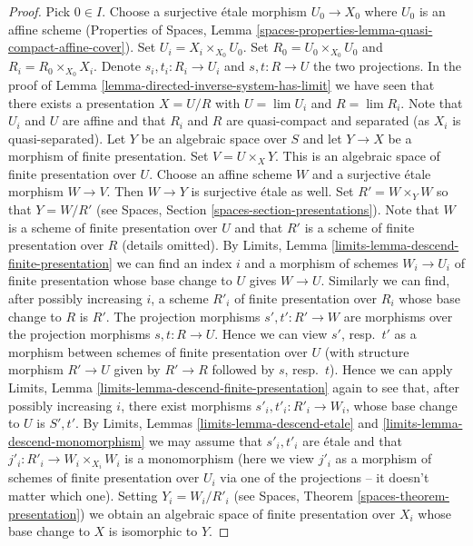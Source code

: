 \begin{proof}
Pick $0 \in I$. Choose a surjective \'etale morphism $U_0 \to X_0$ where
$U_0$ is an affine scheme (Properties of Spaces, Lemma
\ref{spaces-properties-lemma-quasi-compact-affine-cover}).
Set $U_i = X_i \times_{X_0} U_0$. Set $R_0 = U_0 \times_{X_0} U_0$ and
$R_i = R_0 \times_{X_0} X_i$. Denote $s_i, t_i : R_i \to U_i$ and
$s, t : R \to U$ the two projections. In the proof of
Lemma \ref{lemma-directed-inverse-system-has-limit} we have
seen that there exists a presentation $X = U/R$ with
$U = \lim U_i$ and $R = \lim R_i$. Note that $U_i$ and $U$ are affine and
that $R_i$ and $R$ are quasi-compact and separated (as $X_i$ is
quasi-separated). Let $Y$ be an algebraic space over $S$ and let
$Y \to X$ be a morphism of finite presentation. Set $V = U \times_X Y$.
This is an algebraic space of finite presentation over $U$.
Choose an affine scheme $W$ and a surjective \'etale morphism $W \to V$.
Then $W \to Y$ is surjective \'etale as well. Set $R' = W \times_Y W$
so that $Y = W/R'$ (see Spaces, Section \ref{spaces-section-presentations}).
Note that $W$ is a scheme of finite presentation over $U$ and that $R'$
is a scheme of finite presentation over $R$ (details omitted).
By Limits, Lemma \ref{limits-lemma-descend-finite-presentation}
we can find an index $i$ and a morphism of schemes $W_i \to U_i$ of
finite presentation whose base change to $U$ gives $W \to U$. Similarly
we can find, after possibly increasing $i$, a scheme $R'_i$ of finite
presentation over $R_i$ whose base change to $R$ is $R'$.
The projection morphisms $s', t' : R' \to W$ are morphisms over
the projection morphisms $s, t : R \to U$. Hence we can view $s'$,
resp.\ $t'$ as a morphism between schemes of finite presentation over
$U$ (with structure morphism $R' \to U$ given by $R' \to R$ followed
by $s$, resp.\ $t$). Hence we can apply
Limits, Lemma \ref{limits-lemma-descend-finite-presentation}
again to see that, after possibly increasing $i$, there exist
morphisms $s'_i, t'_i : R'_i \to W_i$, whose base change to $U$
is $S', t'$. By Limits, Lemmas \ref{limits-lemma-descend-etale} and
\ref{limits-lemma-descend-monomorphism}
we may assume that $s'_i, t'_i$ are \'etale and that
$j'_i : R'_i \to W_i \times_{X_i} W_i$ is a monomorphism (here we
view $j'_i$ as a morphism of schemes of finite presentation over $U_i$ via
one of the projections -- it doesn't matter which one). Setting
$Y_i = W_i/R'_i$ (see Spaces, Theorem \ref{spaces-theorem-presentation})
we obtain an algebraic space of finite presentation
over $X_i$ whose base change to $X$ is isomorphic to $Y$.


\end{proof}
